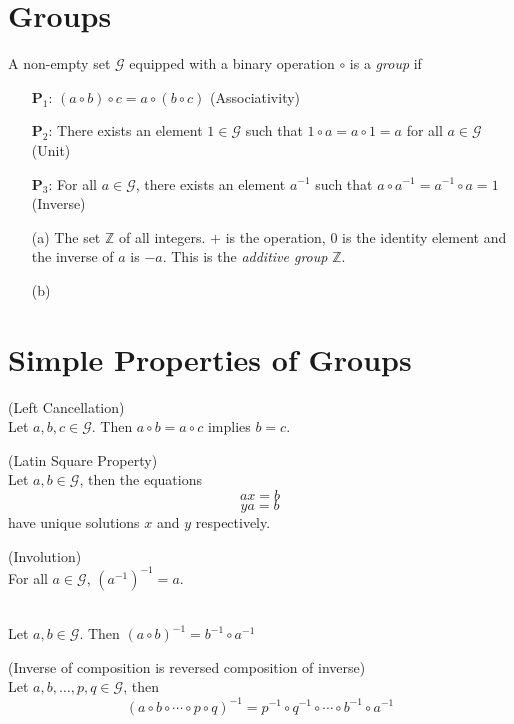 \section{Groups}

A non-empty set $\mathcal{G}$ equipped with a binary operation $\circ$ is a \textit{group} if 
\begin{itemize}
    \item[$\mathbf{P}_1$:] $(a \circ b) \circ c = a \circ (b \circ c)$ (Associativity)
    \item[$\mathbf{P}_2$:] There exists an element $1 \in \mathcal{G}$ such that $1 \circ a = a \circ 1 = a$ for all $a \in \mathcal{G}$ (Unit)
    \item[$\mathbf{P}_3$:] For all $a \in \mathcal{G}$, there exists an element $a^{-1}$ such that $a \circ a^{-1} = a^{-1} \circ a = 1$ (Inverse)
\end{itemize}

\example
\begin{itemize}
    \item[(a)] The set $\mathbb{Z}$ of all integers. $+$ is the operation, $0$ is the identity element and the inverse of $a$ is $-a$. This is the \textit{additive group} $\mathbb{Z}$.
    \item[(b)] 
\end{itemize}


\section{Simple Properties of Groups}

\theorem (Left Cancellation) \\
Let $a,b,c \in \mathcal{G}$. Then $a \circ b = a \circ c$ implies $b = c$.

\theorem (Latin Square Property) \\ 
Let $a, b \in \mathcal{G}$, then the equations 
\[ax = b\]
\[ya = b\]
have unique solutions $x$ and $y$ respectively.

\theorem (Involution) \\
For all $a \in \mathcal{G}$, $(a^{-1})^{-1} = a$.

\theorem  \\
Let $a, b \in \mathcal{G}$. Then $(a \circ b)^{-1} = b^{-1} \circ a^{-1}$

\theorem (Inverse of composition is reversed composition of inverse) \\
Let $a, b, \ldots, p, q \in \mathcal{G}$, then 
\[(a \circ b \circ \cdots \circ p \circ q)^{-1} = p^{-1} \circ q^{-1} \circ \cdots \circ b^{-1} \circ a^{-1}\]

